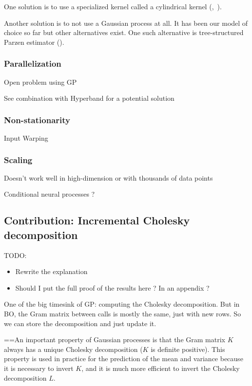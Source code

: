 One solution is to use a specialized kernel called a cylindrical kernel (\textcite{swersky2013},~\textcite{oh2018}).

Another solution is to not use a Gaussian process at all. It has been our model of choice so far but other alternatives exist. One such alternative is tree-structured Parzen estimator (\textcite{bergstra2011NIPS}).

\subsubsection{Parallelization}

Open problem using GP

See combination with Hyperband for a potential solution

\subsubsection{Non-stationarity}
\label{ssec:nosta}

Input Warping~\textcite{snoek2014ICML}

\subsubsection{Scaling}

Doesn't work well in high-dimension or with thousands of data points

Conditional neural processes ?

\subsection{Contribution: Incremental Cholesky decomposition}

TODO:
\begin{itemize}
    \item Rewrite the explanation
    \item Should I put the full proof of the results here ? In an appendix ?  
\end{itemize}

One of the big timesink of GP: computing the Cholesky decomposition. But in BO, the Gram matrix between calls is mostly the same, just with new rows. So we can store the decomposition and just update it.

==An important property of Gaussian processes is that the Gram matrix $K$ always has a unique Cholesky decomposition ($K$ is definite positive). This property is used in practice for the prediction of the mean and variance because it is necessary to invert $K$, and it is much more efficient to invert the Cholesky decomposition $L$.

